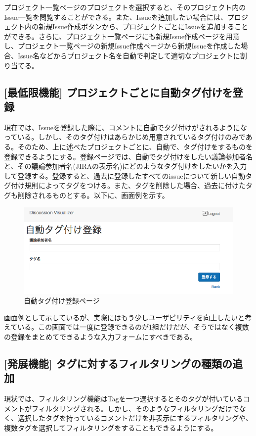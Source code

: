 \documentclass[12pt, oneside]{jreport}
\begin{document}
		プロジェクト一覧ページのプロジェクトを選択すると、そのプロジェクト内のIssue一覧を閲覧することができる。また、Issueを追加したい場合には、プロジェクト内の新規Issue作成ボタンから、プロジェクトごとにIssueを追加することができる。さらに、プロジェクト一覧ページにも新規Issue作成ページを用意し、プロジェクト一覧ページの新規Issue作成ページから新規Issueを作成した場合、Issue名などからプロジェクト名を自動で判定して適切なプロジェクトに割り当てる。
		
		\subsection{[最低限機能] プロジェクトごとに自動タグ付けを登録}
		現在では、Issueを登録した際に、コメントに自動でタグ付けがされるようになっている。しかし、そのタグ付けはあらかじめ用意されているタグ付けのみである。そのため、上に述べたプロジェクトごとに、自動で、タグ付けをするものを登録できるようにする。登録ページでは、自動でタグ付けをしたい議論参加者名と、その議論参加者名(JIRAの表示名)にどのようなタグ付けをしたいかを入力して登録する。登録すると、過去に登録したすべてのissueについて新しい自動タグ付け規則によってタグをつける。また、タグを削除した場合、過去に付けたタグも削除されるものとする。以下に、画面例を示す。
		\begin{figure}[H]
		\centering
		\includegraphics[width=17cm,bb=500 300 -200 27]{TagAdd.png}
		\caption{自動タグ付け登録ページ}
		\end{figure}
		
		画面例として示しているが、実際にはもう少しユーザビリティを向上したいと考えている。この画面では一度に登録できるのが1組だけだが、そうではなく複数の登録をまとめてできるような入力フォームにすべきである。

		\subsection{[発展機能] タグに対するフィルタリングの種類の追加}
		現状では、フィルタリング機能はTagを一つ選択するとそのタグが付いているコメントがフィルタリングされる。しかし、そのようなフィルタリングだけでなく、選択したタグを持っているコメントだけを非表示にするフィルタリングや、複数タグを選択してフィルタリングをすることもできるようにする。
\end{document}

